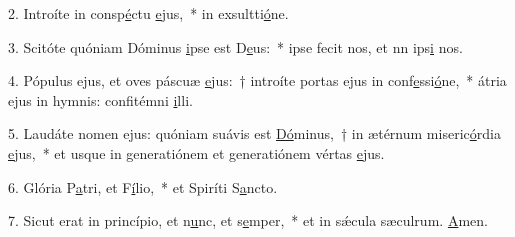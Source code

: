 2. Introíte in consp\uline{é}ctu \uline{e}jus,~* in exsultti\uline{ó}ne.\par 
3. Scitóte quóniam Dóminus \uline{i}pse est D\uline{e}us:~* ipse fecit nos, et nn ips\uline{i} nos.\par 
4. Pópulus ejus, et oves páscuæ \uline{e}jus:~† introíte portas ejus in conf\uline{e}ssi\uline{ó}ne,~* átria ejus in hymnis: confitémni \uline{i}lli.\par 
5. Laudáte nomen ejus: quóniam suávis est \uline{Dó}minus,~† in ætérnum miseric\uline{ó}rdia \uline{e}jus,~* et usque in generatiónem et generatiónem vértas \uline{e}jus.\par 
6. Glória P\uline{a}tri, et F\uline{í}lio,~* et Spiríti S\uline{a}ncto.\par 
7. Sicut erat in princípio, et n\uline{u}nc, et s\uline{e}mper,~* et in sǽcula sæculrum. \uline{A}men.\par 
